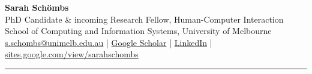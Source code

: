 \documentclass[a4paper, 11pt]{article}
\begin{document}
\begin{center}
  {\Large\textbf{Sarah Schömbs}}\\[2pt]
  PhD Candidate \& incoming Research Fellow, Human-Computer Interaction \\
  School of Computing and Information Systems, University of Melbourne\\[2pt]
  \href{mailto:s.schombs@unimelb.edu.au}{s.schombs@unimelb.edu.au}
  \;|\;
  \href{https://scholar.google.com.au/citations?user=0h3pDqgAAAAJ&hl=en}{Google Scholar}
  \;|\;
  \href{https://www.linkedin.com/in/sarah-schoembs}{LinkedIn}
  \;|\;
  \href{https://sites.google.com/view/sarahschombs/}{sites.google.com/view/sarahschombs}
\end{center}

\smallskip
\hrule
\smallskip
\end{document}
